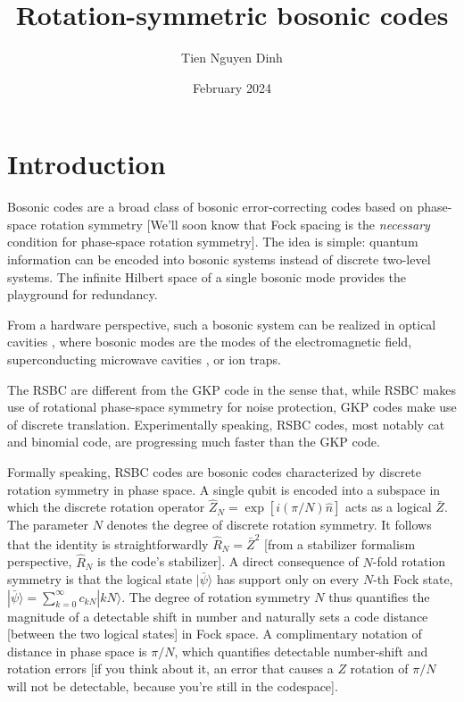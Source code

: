 \documentclass{article}
\title{Rotation-symmetric bosonic codes}
\author{Tien Nguyen Dinh}
\date{February 2024}
\begin{document}
\maketitle

\section{Introduction}
Bosonic codes are a broad class of bosonic error-correcting codes based on phase-space rotation symmetry [We'll soon know that Fock spacing is the \textit{necessary} condition for phase-space rotation symmetry]. The idea is simple: quantum information can be encoded into bosonic systems instead of discrete two-level systems. The infinite Hilbert space of a single bosonic mode provides the playground for redundancy.

From a hardware perspective, such a bosonic system can be realized in optical cavities \cite{kimble1998_cavityQED}, where bosonic modes are the modes of the electromagnetic field, superconducting microwave cavities \cite{gao22_squeezed}, or ion traps. 

The RSBC are different from the GKP code \cite{gkp01} in the sense that, while RSBC makes use of rotational phase-space symmetry for noise protection, GKP codes make use of discrete translation. Experimentally speaking, RSBC codes, most notably cat and binomial code, are progressing much faster than the GKP code. 

Formally speaking, RSBC codes are bosonic codes characterized by discrete rotation symmetry in phase space. A single qubit is encoded into a subspace in which the discrete rotation operator $\hat{Z}_N=\exp[i(\pi/N)\hat{n}]$ acts as a logical $\bar{Z}$. The parameter $N$ denotes the degree of discrete rotation symmetry. It follows that the identity is straightforwardly $\hat{R}_N=\bar{Z}^2$ [from a stabilizer formalism perspective, $\hat{R}_N$ is the code's stabilizer]. A direct consequence of $N$-fold rotation symmetry is that the logical state $|\bar{\psi}\rangle$ has support only on every $N$-th Fock state, $|\bar{\psi}\rangle=\sum_{k=0}^\infty c_{kN}|kN\rangle$. The degree of rotation symmetry $N$ thus quantifies the magnitude of a detectable shift in number and naturally sets a code distance [between the two logical states] in Fock space. A complimentary notation of distance in phase space is $\pi/N$, which quantifies detectable number-shift and rotation errors [if you think about it, an error that causes a $Z$ rotation of $\pi/N$ will not be detectable, because you're still in the codespace]. 
\end{document}
